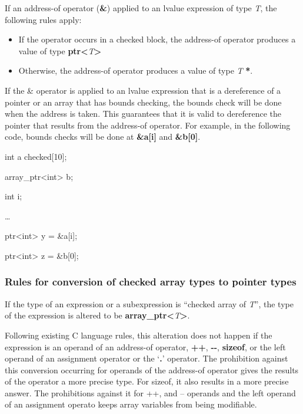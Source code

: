 \documentclass[]{article}
\begin{document}
If an address-of operator (\textbf{\&}) applied to an lvalue expression
of type \emph{T}, the following rules apply:

\begin{itemize}
\item
  If the operator occurs in a checked block, the address-of operator
  produces a value of type
  \textbf{ptr\textless{}}\emph{T}\textbf{\textgreater{}}
\item
  Otherwise, the address-of operator produces a value of type \emph{T}
  \textbf{*}.
\end{itemize}

If the \& operator is applied to an lvalue expression that is a
dereference of a pointer or an array that has bounds checking, the
bounds check will be done when the address is taken. This guarantees
that it is valid to dereference the pointer that results from the
address-of operator. For example, in the following code, bounds checks
will be done at \textbf{\&a{[}i{]}} and \textbf{\&b{[}0{]}}.

int a checked{[}10{]};

array\_ptr\textless{}int\textgreater{} b;

int i;

\ldots{}

ptr\textless{}int\textgreater{} y = \&a{[}i{]};

ptr\textless{}int\textgreater{} z = \&b{[}0{]};

\subsubsection{\texorpdfstring{\protect\hypertarget{ux5fToc422906960}{}{\protect\hypertarget{ux5fToc424307684}{}{\protect\hypertarget{ux5fToc426641062}{}{\protect\hypertarget{ux5fToc435434922}{}{\protect\hypertarget{ux5fToc437460743}{}{\protect\hypertarget{ux5fToc440445415}{}{\protect\hypertarget{ux5fToc440449197}{}{\protect\hypertarget{ux5fToc440551847}{}{}}}}}}}}Rules
for conversion of checked array types to pointer
types}{Rules for conversion of checked array types to pointer types}}\label{rules-for-conversion-of-checked-array-types-to-pointer-types}

If the type of an expression or a subexpression is ``checked array of
\emph{T}'', the type of the expression is altered to be
\textbf{array\_ptr\textless{}}\emph{T}\textbf{\textgreater{}}.

Following existing C language rules, this alteration does not happen if
the expression is an operand of an address-of operator, \textbf{++},
\textbf{-\/-}, \textbf{sizeof}, or the left operand of an assignment
operator or the `\textbf{.}' operator. The prohibition against this
conversion occurring for operands of the address-of operator gives the
results of the operator a more precise type. For sizeof, it also results
in a more precise answer. The prohibitions against it for ++, and --
operands and the left operand of an assignment operato keeps array
variables from being modifiable.
\end{document}
